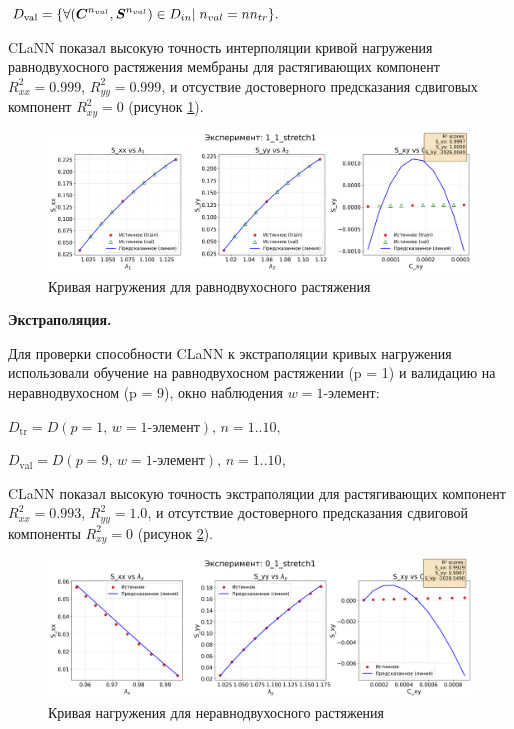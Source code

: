   $D_{\mathrm{val}}=\{\forall (\boldsymbol{C}^{n_{val}}, \boldsymbol{S}^{n_{val}}) \in D_{in}|\; n_{val}=n \\  n_{tr}\}.$

  CLaNN показал высокую точность интерполяции кривой нагружения равнодвухосного растяжения мембраны 
  для растягивающих компонент $R^2_{xx}=0.999$, $R^2_{yy}=0.999$, и отсуствие достоверного предсказания сдвиговых 
  компонент $R^2_{xy}=0$ (рисунок \ref{fig:interpolation}).
  
  \begin{figure}[H]
    \centering
    \includegraphics[width=1.0\textwidth]{img/interpolation.png}
    \caption{Кривая нагружения для равнодвухосного растяжения}
    \label{fig:interpolation}
  \end{figure}
  
  \textbf{Экстраполяция.}
  
  Для проверки способности CLaNN к экстраполяции кривых нагружения использовали обучение на равнодвухосном растяжении (p = 1) и валидацию на неравнодвухосном (p = 9), 
  окно наблюдения $w=\text{1-элемент}$:
  
  $D_{\mathrm{tr}} = D(p{=}1,\,w{=}\text{1-элемент}),\, n = 1..10,$
  
  $D_{\mathrm{val}} = D(p{=}9,\,w{=}\text{1-элемент}),\, n = 1..10,$
  
  CLaNN показал высокую точность экстраполяции для растягивающих компонент $R^2_{xx}=0.993$, $R^2_{yy}=1.0$, и отсутствие достоверного предсказания сдвиговой компоненты $R^2_{xy}=0$ (рисунок \ref{fig:extrapolation}).


  \begin{figure}[H]
    \centering
    \includegraphics[width=1.0\textwidth]{img/extrapolation.png}
    \caption{Кривая нагружения для неравнодвухосного растяжения}
    \label{fig:extrapolation}
  \end{figure}
   
